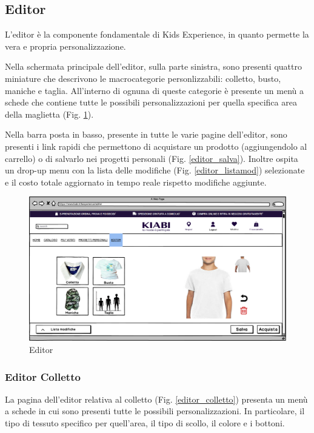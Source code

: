 \documentclass[12pt,italian,]{report}
\begin{document}
\newpage
\subsection{Editor} 

L'editor è la componente fondamentale di Kids Experience, in quanto permette la vera e propria personalizzazione.

Nella schermata principale dell'editor, sulla parte sinistra, sono presenti quattro miniature che descrivono le macrocategorie personlizzabili: colletto, busto, maniche e taglia. All'interno di ognuna di queste categorie è presente un menù a schede che contiene tutte le possibili personalizzazioni per quella specifica area della maglietta (Fig. \ref{editor}).

Nella barra posta in basso, presente in tutte le varie pagine  dell'editor, sono presenti i link rapidi che permettono di acquistare un prodotto (aggiungendolo al carrello) o di salvarlo nei progetti personali (Fig. \ref{editor_salva}). Inoltre ospita un drop-up menu con la lista delle modifiche (Fig. \ref{editor_listamod}) selezionate e il costo totale aggiornato in tempo reale rispetto modifiche aggiunte.


\begin{figure}[h]
\centering
\includegraphics{../../balsamiq/balsamiq_finale/Editorbase.png}
\caption{Editor}
\label{editor}
\end{figure}


\newpage
\subsubsection{Editor Colletto} 

La pagina dell'editor relativa al colletto (Fig. \ref{editor_colletto}) presenta un menù a schede in cui sono presenti tutte le possibili personalizzazioni. In particolare, il tipo di tessuto specifico per quell'area, il tipo di scollo, il colore e i bottoni.
\end{document}
